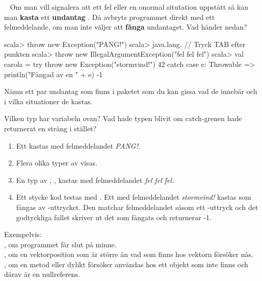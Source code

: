 \QUESTBEGIN

\Task  \what~  Om man vill signalera att ett fel eller en onormal situtation uppstått så kan man \textbf{kasta}  ett \textbf{undantag} . Då avbryts programmet direkt med ett felmeddelande, om man inte väljer att \textbf{fånga}  undantaget.
\Subtask Vad händer nedan?
\begin{REPL}
scala> throw new Exception("PANG!")
scala> java.lang.   // Tryck TAB efter punkten
scala> throw new IllegalArgumentException("fel fel fel")
scala> val carola = 
         try 
           throw new Exception("stormvind!")
           42
         catch 
           case e: Throwable => 
             println("Fångad av en " + e)
             -1
\end{REPL}
\Subtask Nämn ett par undantag som finns i paketet  som du kan gissa vad de innebär och i vilka situationer de kastas.

\Subtask Vilken typ har variabeln  ovan? Vad hade typen blivit om catch-grenen hade returnerat en sträng i stället?

\SOLUTION


\TaskSolved \what


\SubtaskSolved  \begin{enumerate}
\item Ett  kastas med felmeddelandet \textit{PANG!}.
\item Flera olika typer av  visas.
\item En typ av , , kastas med felmeddelandet \textit{fel fel fel}.
\item Ett stycke kod testas med . Ett  med felmeddelandet \textit{stormvind!} kastas som fångas av -uttrycket. Den matchar felmeddelandet såsom ett -uttryck och det godtyckliga fallet  skriver ut det  som fångats och returnerar -1.
\end{enumerate}

\SubtaskSolved  Exempelvis: \\
, om programmet får slut på minne.\\
, om en vektorposition som är större än vad som finns hos vektorn försöker nås.\\
, om en metod eller dylikt försöker användas hos ett objekt som inte finns och därav är en nullreferens.

